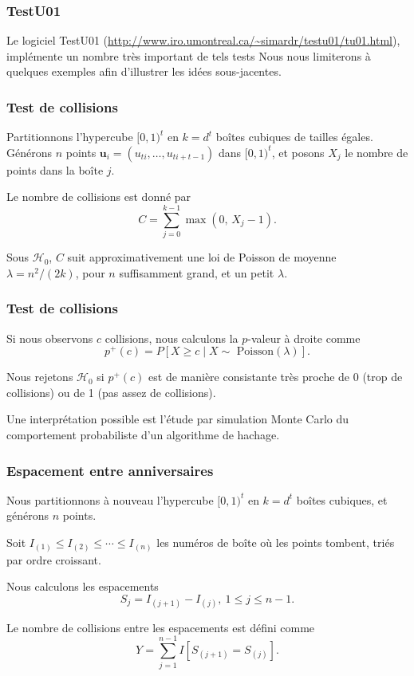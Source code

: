 \documentclass[t,usepdftitle=false]{beamer}
\def\bu{\boldsymbol{u}}
\def\cH{\mathcal{H}}
\begin{document}
\begin{frame}
\frametitle{TestU01}

Le logiciel TestU01 (\url{http://www.iro.umontreal.ca/~simardr/testu01/tu01.html}), implémente un nombre très important de tels tests
Nous nous limiterons à quelques exemples afin d'illustrer les idées sous-jacentes.

\end{frame}

\begin{frame}
\frametitle{Test de collisions} 

Partitionnons l'hypercube $[0,1)^t$ en $k = d^t$ boîtes cubiques de
tailles égales.
Générons $n$ points $\bu_i = (u_{ti}, \dots, u_{ti+t-1})$ dans $[0,1)^t$, et
posons $X_j$ le nombre de points dans la boîte $j$.

\mbox{}

Le nombre de collisions est donné par
\[
  {C} = \sum_{j=0}^{k-1} \max(0,\, X_j-1).
\]

\mbox{}

Sous $\cH_0$, $C$ suit approximativement une loi de Poisson de moyenne $\lambda = n^2/(2k)$,
pour $n$ suffisamment grand, et un petit $\lambda$.

\end{frame}

\begin{frame}
\frametitle{Test de collisions} 

Si nous observons $c$ collisions, nous calculons la $p$-valeur à
droite comme
\[
   p^+(c) = P[X \ge c \mid X \sim \mbox{ Poisson}(\lambda)].
\]

\mbox{}

Nous rejetons $\cH_0$ si $p^+(c)$ est de manière consistante très
proche de 0 (trop de collisions) ou de 1 (pas assez de collisions).

\mbox{}

Une interprétation possible est l'étude par simulation Monte Carlo du comportement probabiliste d'un algorithme de hachage.

\end{frame}

\begin{frame}
\frametitle{Espacement entre anniversaires}

Nous partitionnons à nouveau l'hypercube $[0,1)^t$ en $k=d^t$ boîtes
cubiques, et générons $n$ points.

\mbox{}

Soit $I_{(1)}\le I_{(2)}\le \cdots\le I_{(n)}$ les numéros de boîte où les points tombent, triés par ordre croissant.

\mbox{}

Nous calculons les espacements
\[
S_j = I_{(j+1)}-I_{(j)},\ 1\le j \le n-1.
\]

\mbox{}
Le nombre de collisions entre les espacements est défini comme
\[
  Y = \sum_{j=1}^{n-1} I\left[S_{(j+1)}=S_{(j)}\right].
\]

\end{frame}
\end{document}
